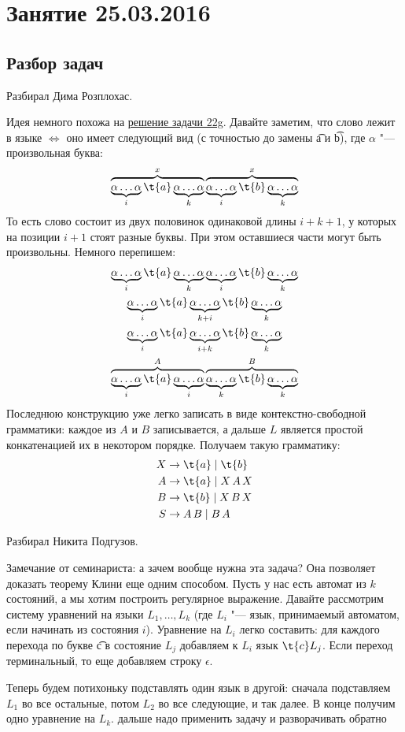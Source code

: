 \chapter{Занятие 25.03.2016}
\section{Разбор задач}

	Разбирал Дима Розплохас.

	Идея немного похожа на \hyperref[prob22g]{решение задачи 22g}.
	Давайте заметим, что слово лежит в языке $\iff$ оно имеет следующий вид (с точностью до замены \t{a} и \t{b}),
	где $\alpha$ "--- произвольная буква:
	\[
		\overbrace{\somealpha{i}\t{a}\somealpha{k}}^x \overbrace{\somealpha{i}\t{b}\somealpha{k}}^x
	\]
	То есть слово состоит из двух половинок одинаковой длины $i+k+1$, у которых на позиции $i+1$ стоят разные буквы.
	При этом оставшиеся части могут быть произвольны.
	Немного перепишем:
	\begin{gather*}
		\somealpha{i}\t{a}\somealpha{k}\somealpha{i}\t{b}\somealpha{k} \\
		\somealpha{i}\t{a}\somealpha{k+i}\t{b}\somealpha{k} \\
		\somealpha{i}\t{a}\somealpha{i+k}\t{b}\somealpha{k} \\
		\overbrace{\somealpha{i}\t{a}\somealpha{i}}^{A}\overbrace{\somealpha{k}\t{b}\somealpha{k}}^{B}
	\end{gather*}
	Последнюю конструкцию уже легко записать в виде контекстно-свободной грамматики: каждое из $A$ и $B$
	записывается, а дальше $L$ является простой конкатенацией их в некотором порядке.
	Получаем такую грамматику:
	\begin{align*}
		X &\to \t{a} \mid \t{b} \\
		A &\to \t{a} \mid X\,A\,X \\
		B &\to \t{b} \mid X\,B\,X \\
		S &\to A\,B \mid B\,A
	\end{align*}

	Разбирал Никита Подгузов.
	\TODO

	\begin{Rem}
		Замечание от семинариста: а зачем вообще нужна эта задача?
		Она позволяет доказать теорему Клини еще одним способом.
		Пусть у нас есть автомат из $k$ состояний, а мы хотим построить регулярное выражение.
		Давайте рассмотрим систему уравнений на языки $L_1, \dots, L_k$ (где $L_i$ "--- язык,
		принимаемый автоматом, если начинать из состояния $i$).
		Уравнение на $L_i$ легко составить: для каждого перехода по букве \t{c} в состояние $L_j$
		добавляем к $L_i$ язык $\t{c}L_j$.
		Если переход терминальный, то еще добавляем строку $\epsilon$.

		Теперь будем потихоньку подставлять один язык в другой: сначала подставляем $L_1$ во все остальные,
		потом $L_2$ во все следующие, и так далее.
		В конце получим одно уравнение на $L_k$.
		\TODO дальше надо применить задачу и разворачивать обратно
	\end{Rem}

